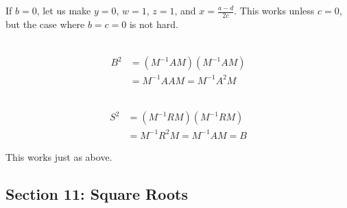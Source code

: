 \documentclass{article}
\begin{document}
\begin{description}
\begin{enumerate}[\hspace{1cm}(I)]
        If $b = 0$, let us make $y=0$, $w=1$, $z=1$, and $x = \frac{a-d}{2c}$. This works unless $c=0$, but the case where $b=c=0$ is not hard.

    \end{enumerate}

  \item[144.] $\ $
    \begin{align*}
    B^2 & = (M^{-1}AM) (M^{-1}AM) \\ 
        & = M^{-1}AAM = M^{-1}A^2M
    \end{align*}

  \item[145.] $\ $
    \begin{align*}
    S^2 & = (M^{-1}RM) (M^{-1}RM) \\ 
        & = M^{-1}R^2M = M^{-1}AM = B
    \end{align*}

  \item[146.] This works just as above.

\end{description}


\subsection*{Section 11: Square Roots}
\end{document}
